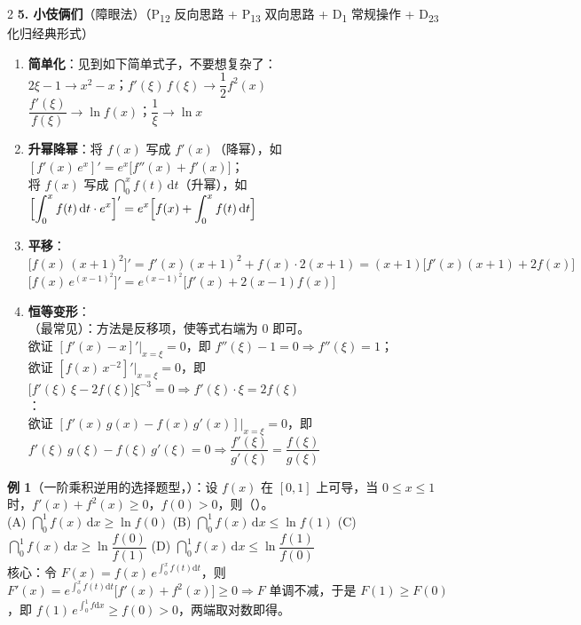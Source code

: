 \documentclass[a4paper,11pt]{article}
\begin{document}
\begin{multicols}{2}
\textbf{5. 小伎俩们}（障眼法）（P\textsubscript{12} 反向思路 + P\textsubscript{13} 双向思路 + D\textsubscript{1} 常规操作 + D\textsubscript{23} 化归经典形式）
        \begin{enumerate}[label=(\arabic*), leftmargin=2em, itemsep=0.65em]
            \item \textbf{简单化}：见到如下简单式子，不要想复杂了：
            \\$2\xi - 1 \to x^{2} - x$；\quad $f'(\xi)\,f(\xi) \to \dfrac{1}{2}f^{2}(x)$
            \\$\dfrac{f'(\xi)}{f(\xi)} \to \ln f(x)$；\quad $\dfrac{1}{\xi} \to \ln x$
            \item \textbf{升幂降幂}：将 $f(x)$ 写成 $f'(x)$（降幂），如 $[f'(x)\,e^{x}]' = e^{x}\bigl[f''(x) + f'(x)\bigr]$；
            \\将 $f(x)$ 写成 $\dint_{0}^{x} f(t)\,\mathrm{d}t$（升幂），如 $\Bigl[\displaystyle\int_{0}^{x} f(t)\,\mathrm{d}t \cdot e^{x}\Bigr]' = e^{x}\Bigl[f(x) + \displaystyle\int_{0}^{x} f(t)\,\mathrm{d}t\Bigr]$
            \item \textbf{平移}：
            \\$\bigl[f(x)\,(x + 1)^{2}\bigr]' = f'(x)(x + 1)^{2} + f(x)\cdot 2(x + 1) = (x + 1)\bigl[f'(x)(x + 1) + 2f(x)\bigr]$
            \\$\bigl[f(x)\,e^{(x - 1)^{2}}\bigr]' = e^{(x - 1)^{2}}\bigl[f'(x) + 2(x - 1)f(x)\bigr]$
            \item \textbf{恒等变形}：
            \\{\color{red}{(a) 移项}}（最常见）：方法是反移项，使等式右端为 $0$ 即可。
            \\欲证 $[f'(x) - x]'\bigr|_{x = \xi} = 0$，即 $f''(\xi) - 1 = 0 \Rightarrow f''(\xi) = 1$；
            \\欲证 $[f(x)\,x^{-2}]'\bigr|_{x = \xi} = 0$，即 $\bigl[f'(\xi)\,\xi - 2f(\xi)\bigr]\xi^{-3} = 0 \Rightarrow f'(\xi)\cdot\xi = 2f(\xi)$
            \\{\color{red}{(b) 作乘除运算}}：
            \\欲证 $[f'(x)\,g(x) - f(x)\,g'(x)]\bigr|_{x = \xi} = 0$，即 $f'(\xi)\,g(\xi) - f(\xi)\,g'(\xi) = 0 \Rightarrow \dfrac{f'(\xi)}{g'(\xi)} = \dfrac{f(\xi)}{g(\xi)}$
        \end{enumerate}
\vspace{0.6em}

\textbf{例 1}（一阶乘积逆用的选择题型，{\color{red}{应选 (C)}}）：设 $f(x)$ 在 $[0, 1]$ 上可导，当 $0 \le x \le 1$ 时，$f'(x) + f^{2}(x) \ge 0$，$f(0) > 0$，则（\quad）。
        \\(A) $\dint_{0}^{1} f(x)\,\mathrm{d}x \ge \ln f(0)$ \quad
        (B) $\dint_{0}^{1} f(x)\,\mathrm{d}x \le \ln f(1)$ \quad
        (C) $\dint_{0}^{1} f(x)\,\mathrm{d}x \ge \ln\dfrac{f(0)}{f(1)}$ \quad
        (D) $\dint_{0}^{1} f(x)\,\mathrm{d}x \le \ln\dfrac{f(1)}{f(0)}$
        \\核心：令 $F(x) = f(x)\,e^{\int_{0}^{x} f(t)\mathrm{d}t}$，则 $F'(x) = e^{\int_{0}^{x} f(t)\mathrm{d}t}\bigl[f'(x) + f^{2}(x)\bigr] \ge 0 \Rightarrow F$ 单调不减，于是 $F(1) \ge F(0)$，即 $f(1)\,e^{\int_{0}^{1} f\mathrm{d}x} \ge f(0) > 0$，两端取对数即得。


\end{multicols}
\end{document}
